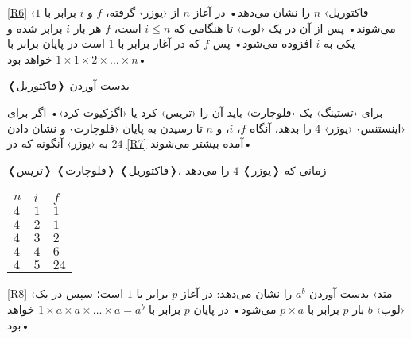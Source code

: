 \documentclass[openany, twocolumn]{book}
\begin{document}
\ref{R6} ‹فاکتوریل› $n$ را نشان می‌دهد• در آغاز $n$ از ‹یوزر› گرفته، $f$ و $i$ برابر با $1$ می‌شوند• پس از آن در یک ‹لوپ› تا هنگامی که $i\le n$ است، $f$ هر بار $i$ برابر شده و یکی به $i$ افزوده می‌شود• پس $f$ که در آغاز برابر با $1$ است در پایان برابر با $1\times1\times2\times\ldots\times n$ خواهد بود•

\begin{Flowchart}

\caption{بدست آوردن ❬فاکتوریل❭\label{R6}}
\end{Flowchart}

برای ‹تستینگ› یک ‹فلوچارت› باید آن را ‹تریس› کرد یا ‹اگزکیوت کرد›• اگر برای ‹اینستنس› ‹یوزر› $4$ را بدهد، آنگاه $f$، $i$، و $n$ تا رسیدن به پایان ‹فلوچارت› و نشان دادن $24$ به ‹یوزر› آنگونه که در \ref{R7} آمده بیشتر می‌شوند•

\begin{Table}
\caption{❬تریس❭ ❬فلوچارت❭ ❬فاکتوریل❭، زمانی که ❬یوزر❭ $4$ را می‌دهد\label{R7}}

\begin{tabular}{TTT}
$n$ & $i$ & $f$\\
$4$ & $1$ & $1$\\
$4$ & $2$ & $1$\\
$4$ & $3$ & $2$\\
$4$ & $4$ & $6$\\
$4$ & $5$ & $24$\\
\end{tabular}
\end{Table}

\ref{R8} ‹متد› بدست آوردن $a^{b}$ را نشان می‌دهد: در آغاز $p$ برابر با $1$ است؛ سپس در یک ‹لوپ› $b$ بار $p$ برابر با $p\times a$ می‌شود• در پایان $p$ برابر با $1\times a\times a\times\ldots\times a=a^{b}$ خواهد بود•
\end{document}
